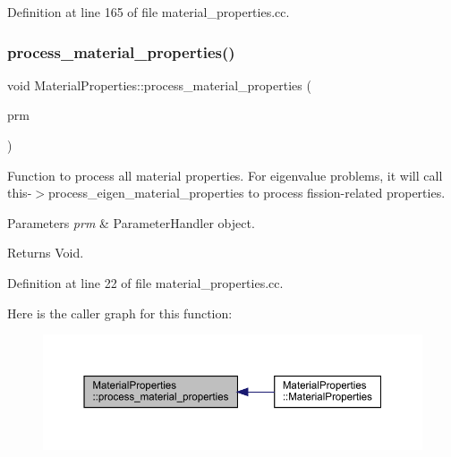 Definition at line 165 of file material\+\_\+properties.\+cc.

\mbox{\label{class_material_properties_a83121d60325c02dbce98968b45134993}} 
\subsubsection{\texorpdfstring{process\+\_\+material\+\_\+properties()}{process\_material\_properties()}}
{\footnotesize\ttfamily void Material\+Properties\+::process\+\_\+material\+\_\+properties (\begin{DoxyParamCaption}\item[{Parameter\+Handler \&}]{prm }\end{DoxyParamCaption})\hspace{0.3cm}{\ttfamily [private]}}

Function to process all material properties. For eigenvalue problems, it will call this-\/$>$process\+\_\+eigen\+\_\+material\+\_\+properties to process fission-\/related properties.


\begin{DoxyParams}{Parameters}
{\em prm} & Parameter\+Handler object. \\
\hline
\end{DoxyParams}
\begin{DoxyReturn}{Returns}
Void. 
\end{DoxyReturn}


Definition at line 22 of file material\+\_\+properties.\+cc.

Here is the caller graph for this function\+:\nopagebreak
\begin{figure}[H]
\begin{center}
\leavevmode
\includegraphics[width=350pt]{class_material_properties_a83121d60325c02dbce98968b45134993_icgraph}
\end{center}
\end{figure}


